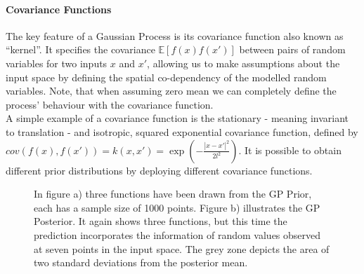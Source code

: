 \paragraph{Covariance Functions}
The key feature of a Gaussian Process is its covariance function also known as ``kernel''. It specifies the covariance $\mathbb{E}[f(x)f(x')]$ between pairs of random variables for two inputs $x$ and $x'$, allowing us to make assumptions about the input space by defining the spatial co-dependency of the modelled random variables. Note, that when assuming zero mean we can completely define the process' behaviour with the covariance function.\\
A simple example of a covariance function is the stationary - meaning invariant to translation - and isotropic, squared exponential covariance function, defined by $cov(f(x),f(x'))=k(x,x')=\exp(-\frac{\left|x-x'\right|^2}{2l^{2}})$. It is possible to obtain different prior distributions by deploying different covariance functions.
\begin{figure}[h!]
\caption{In figure a) three functions have been drawn from the GP Prior, each has a sample size of 1000 points. Figure b) illustrates the GP Posterior. It again shows three functions, but this time the prediction incorporates the information of random values observed at seven points in the input space. The grey zone depicts the area of two standard deviations from the posterior mean.}
\label{fig:GPPlot}
\end{figure}


